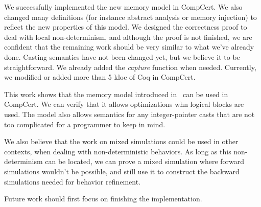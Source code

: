 \label{sec:conclusion}

We successfully implemented the new memory model in CompCert. We also changed many definitions (for instance abstract analysis or memory injection) to reflect the new properties of this model. We designed the correctness proof to deal with local non-determinism, and although the proof is not finished, we are confident that the remaining work should be very similar to what we've already done.
Casting semantics have not been changed yet, but we believe it to be straightforward. We already added the \textit{capture} function when needed.
Currently, we modified or added more than 5 kloc of Coq in CompCert.

This work shows that the memory model introduced in~\cite{DBLP:conf/pldi/KangHMGZV15} can be used in CompCert. We can verify that it allows optimizations whn logical blocks are used. The model also allows semantics for any integer-pointer casts that are not too complicated for a programmer to keep in mind.

We also believe that the work on mixed simulations could be used in other contexts, when dealing with non-deterministic behaviors. As long as this non-determinism can be located, we can prove a mixed simulation where forward simulations wouldn't be possible, and still use it to construct the backward simulations needed for behavior refinement.

Future work should first focus on finishing the implementation.
